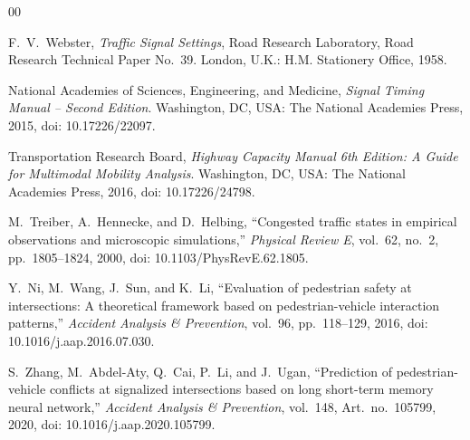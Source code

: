 \documentclass[conference]{IEEEtran}
\begin{document}
\begin{thebibliography}{00}

F.~V.~Webster, \emph{Traffic Signal Settings}, Road Research Laboratory, Road Research Technical Paper No.~39. London, U.K.: H.M. Stationery Office, 1958.

National Academies of Sciences, Engineering, and Medicine, \emph{Signal Timing Manual -- Second Edition}. Washington, DC, USA: The National Academies Press, 2015, doi: 10.17226/22097.

Transportation Research Board, \emph{Highway Capacity Manual 6th Edition: A Guide for Multimodal Mobility Analysis}. Washington, DC, USA: The National Academies Press, 2016, doi: 10.17226/24798.

M.~Treiber, A.~Hennecke, and D.~Helbing, ``Congested traffic states in empirical observations and microscopic simulations,'' \emph{Physical Review E}, vol.~62, no.~2, pp.~1805--1824, 2000, doi: 10.1103/PhysRevE.62.1805.

Y.~Ni, M.~Wang, J.~Sun, and K.~Li, ``Evaluation of pedestrian safety at intersections: A theoretical framework based on pedestrian-vehicle interaction patterns,'' \emph{Accident Analysis \& Prevention}, vol.~96, pp.~118--129, 2016, doi: 10.1016/j.aap.2016.07.030.

S.~Zhang, M.~Abdel-Aty, Q.~Cai, P.~Li, and J.~Ugan, ``Prediction of pedestrian-vehicle conflicts at signalized intersections based on long short-term memory neural network,'' \emph{Accident Analysis \& Prevention}, vol.~148, Art.~no.~105799, 2020, doi: 10.1016/j.aap.2020.105799.

\end{thebibliography}
\end{document}

